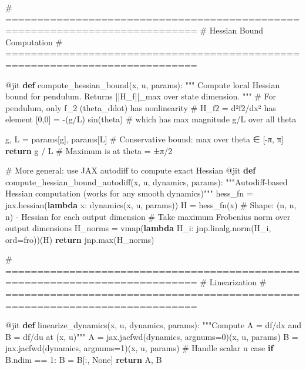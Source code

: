 \documentclass[
  letterpaper,
  DIV=11,
  numbers=noendperiod]{scrartcl}
\newenvironment{Shaded}{\begin{snugshade}}{\end{snugshade}}
\newcommand{\AttributeTok}[1]{\textcolor[rgb]{0.40,0.45,0.13}{#1}}
\newcommand{\BuiltInTok}[1]{\textcolor[rgb]{0.00,0.23,0.31}{#1}}
\newcommand{\CommentTok}[1]{\textcolor[rgb]{0.37,0.37,0.37}{#1}}
\newcommand{\ControlFlowTok}[1]{\textcolor[rgb]{0.00,0.23,0.31}{\textbf{#1}}}
\newcommand{\DecValTok}[1]{\textcolor[rgb]{0.68,0.00,0.00}{#1}}
\newcommand{\KeywordTok}[1]{\textcolor[rgb]{0.00,0.23,0.31}{\textbf{#1}}}
\newcommand{\NormalTok}[1]{\textcolor[rgb]{0.00,0.23,0.31}{#1}}
\newcommand{\OperatorTok}[1]{\textcolor[rgb]{0.37,0.37,0.37}{#1}}
\newcommand{\StringTok}[1]{\textcolor[rgb]{0.13,0.47,0.30}{#1}}
\newcommand{\VariableTok}[1]{\textcolor[rgb]{0.07,0.07,0.07}{#1}}
\begin{document}
\begin{Shaded}
\begin{Highlighting}[]
\CommentTok{\# ============================================================================}
\CommentTok{\# Hessian Bound Computation}
\CommentTok{\# ============================================================================}

\AttributeTok{@jit}
\KeywordTok{def}\NormalTok{ compute\_hessian\_bound(x, u, params):}
    \CommentTok{"""}
\CommentTok{    Compute local Hessian bound for pendulum.}
\CommentTok{    Returns ||H\_f||\_max over state dimension.}
\CommentTok{    """}
    \CommentTok{\# For pendulum, only f\_2 (theta\_ddot) has nonlinearity}
    \CommentTok{\# H\_f2 = d²f2/dx² has element [0,0] = {-}(g/L) sin(theta)}
    \CommentTok{\# which has max magnitude g/L over all theta}

\NormalTok{    g, L }\OperatorTok{=}\NormalTok{ params[}\StringTok{\textquotesingle{}g\textquotesingle{}}\NormalTok{], params[}\StringTok{\textquotesingle{}L\textquotesingle{}}\NormalTok{]}
    \CommentTok{\# Conservative bound: max over theta ∈ [{-}π, π]}
    \ControlFlowTok{return}\NormalTok{ g }\OperatorTok{/}\NormalTok{ L  }\CommentTok{\# Maximum is at theta = ±π/2}

\CommentTok{\# More general: use JAX autodiff to compute exact Hessian}
\AttributeTok{@jit}
\KeywordTok{def}\NormalTok{ compute\_hessian\_bound\_autodiff(x, u, dynamics, params):}
    \CommentTok{"""Autodiff{-}based Hessian computation (works for any smooth dynamics)"""}
\NormalTok{    hess\_fn }\OperatorTok{=}\NormalTok{ jax.hessian(}\KeywordTok{lambda}\NormalTok{ x: dynamics(x, u, params))}
\NormalTok{    H }\OperatorTok{=}\NormalTok{ hess\_fn(x)  }\CommentTok{\# Shape: (n, n, n) {-} Hessian for each output dimension}
    \CommentTok{\# Take maximum Frobenius norm over output dimensions}
\NormalTok{    H\_norms }\OperatorTok{=}\NormalTok{ vmap(}\KeywordTok{lambda}\NormalTok{ H\_i: jnp.linalg.norm(H\_i, }\BuiltInTok{ord}\OperatorTok{=}\StringTok{\textquotesingle{}fro\textquotesingle{}}\NormalTok{))(H)}
    \ControlFlowTok{return}\NormalTok{ jnp.}\BuiltInTok{max}\NormalTok{(H\_norms)}

\CommentTok{\# ============================================================================}
\CommentTok{\# Linearization}
\CommentTok{\# ============================================================================}

\AttributeTok{@jit}
\KeywordTok{def}\NormalTok{ linearize\_dynamics(x, u, dynamics, params):}
    \CommentTok{"""Compute A = df/dx and B = df/du at (x, u)"""}
\NormalTok{    A }\OperatorTok{=}\NormalTok{ jax.jacfwd(dynamics, argnums}\OperatorTok{=}\DecValTok{0}\NormalTok{)(x, u, params)}
\NormalTok{    B }\OperatorTok{=}\NormalTok{ jax.jacfwd(dynamics, argnums}\OperatorTok{=}\DecValTok{1}\NormalTok{)(x, u, params)}
    \CommentTok{\# Handle scalar u case}
    \ControlFlowTok{if}\NormalTok{ B.ndim }\OperatorTok{==} \DecValTok{1}\NormalTok{:}
\NormalTok{        B }\OperatorTok{=}\NormalTok{ B[:, }\VariableTok{None}\NormalTok{]}
    \ControlFlowTok{return}\NormalTok{ A, B}


\end{Highlighting}
\end{Shaded}
\end{document}
